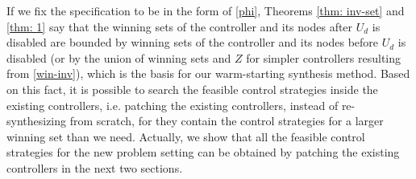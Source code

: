 

If we fix the specification to be in the form of \eqref{phi}, Theorems \ref{thm: inv-set} and \ref{thm: 1} say that the winning sets of the controller and its nodes after $ U_d $ is disabled are bounded by winning sets of the controller and its nodes before $ U_d $ is disabled (or by the union of winning sets and $ Z $ for simpler controllers resulting from \eqref{win-inv}), which is the basis for our warm-starting synthesis method. Based on this fact, it is possible to search the feasible control strategies inside the existing controllers, i.e. patching the existing controllers, instead of re-synthesizing from scratch, for they contain the control strategies for a larger winning set than we need. Actually, we show that all the feasible control strategies for the new problem setting can be obtained by patching the existing controllers in the next two sections.



